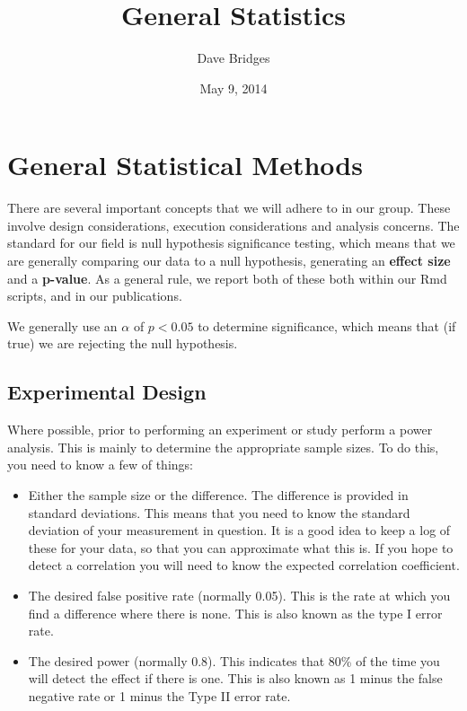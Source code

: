 \documentclass[
]{article}
\title{General Statistics}
\author{Dave Bridges}
\date{May 9, 2014}
\providecommand{\tightlist}{%
  \setlength{\itemsep}{0pt}\setlength{\parskip}{0pt}}
\begin{document}
\maketitle

{
\setcounter{tocdepth}{2}
\tableofcontents
}
\section{General Statistical Methods}\label{general-statistical-methods}

There are several important concepts that we will adhere to in our
group. These involve design considerations, execution considerations and
analysis concerns. The standard for our field is null hypothesis
significance testing, which means that we are generally comparing our
data to a null hypothesis, generating an \textbf{effect size} and a
\textbf{p-value}. As a general rule, we report both of these both within
our Rmd scripts, and in our publications.

We generally use an \(\alpha\) of \(p<0.05\) to determine significance,
which means that (if true) we are rejecting the null hypothesis.

\subsection{Experimental Design}\label{experimental-design}

Where possible, prior to performing an experiment or study perform a
power analysis. This is mainly to determine the appropriate sample
sizes. To do this, you need to know a few of things:

\begin{itemize}
\tightlist
\item
  Either the sample size or the difference. The difference is provided
  in standard deviations. This means that you need to know the standard
  deviation of your measurement in question. It is a good idea to keep a
  log of these for your data, so that you can approximate what this is.
  If you hope to detect a correlation you will need to know the expected
  correlation coefficient.
\item
  The desired false positive rate (normally 0.05). This is the rate at
  which you find a difference where there is none. This is also known as
  the type I error rate.
\item
  The desired power (normally 0.8). This indicates that 80\% of the time
  you will detect the effect if there is one. This is also known as 1
  minus the false negative rate or 1 minus the Type II error rate.
\end{itemize}
\end{document}
